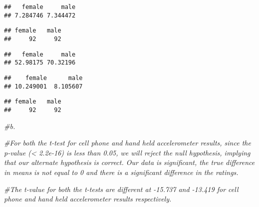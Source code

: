 \documentclass[
]{article}
\newenvironment{Shaded}{\begin{snugshade}}{\end{snugshade}}
\newcommand{\CommentTok}[1]{\textcolor[rgb]{0.56,0.35,0.01}{\textit{#1}}}
\newcommand{\DataTypeTok}[1]{\textcolor[rgb]{0.13,0.29,0.53}{#1}}
\newcommand{\KeywordTok}[1]{\textcolor[rgb]{0.13,0.29,0.53}{\textbf{#1}}}
\newcommand{\NormalTok}[1]{#1}
\newcommand{\OperatorTok}[1]{\textcolor[rgb]{0.81,0.36,0.00}{\textbf{#1}}}
\newcommand{\OtherTok}[1]{\textcolor[rgb]{0.56,0.35,0.01}{#1}}
\newcommand{\StringTok}[1]{\textcolor[rgb]{0.31,0.60,0.02}{#1}}
\begin{document}
\begin{verbatim}
##   female     male 
## 7.284746 7.344472
\end{verbatim}

\begin{verbatim}
## female   male 
##     92     92
\end{verbatim}

\begin{Shaded}
\end{Shaded}

\begin{verbatim}
##   female     male 
## 52.98175 70.32196
\end{verbatim}

\begin{verbatim}
##    female      male 
## 10.249001  8.105607
\end{verbatim}

\begin{verbatim}
## female   male 
##     92     92
\end{verbatim}

\begin{Shaded}
\begin{Highlighting}[]
\CommentTok{#b.}

\CommentTok{#For both the t-test for cell phone and hand held accelerometer results, since the p-value (< 2.2e-16) is less than 0.05, we will reject the null hypothesis, implying that our alternate hypothesis is correct. Our data is significant, the true difference in means is not equal to 0 and there is a significant difference in the ratings.}

\CommentTok{#The t-value for both the t-tests are different at -15.737 and -13.419 for cell phone and hand held accelerometer results respectively.}
\end{Highlighting}
\end{Shaded}
\end{document}
